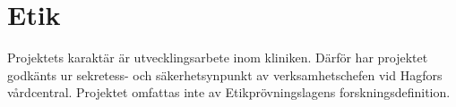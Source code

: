 \documentclass[12pt,a4paper,oneside]{article}
\begin{document}

\section*{Etik}
Projektets karakt{\"a}r {\"a}r utvecklingsarbete inom kliniken. D{\"a}rf{\"o}r har projektet godk{\"a}nts ur sekretess- och s{\"a}kerhetsynpunkt av verksamhetschefen vid Hagfors v{\aa}rdcentral. Projektet omfattas inte av Etikpr{\"o}vningslagens forskningsdefinition.
\end{document}
